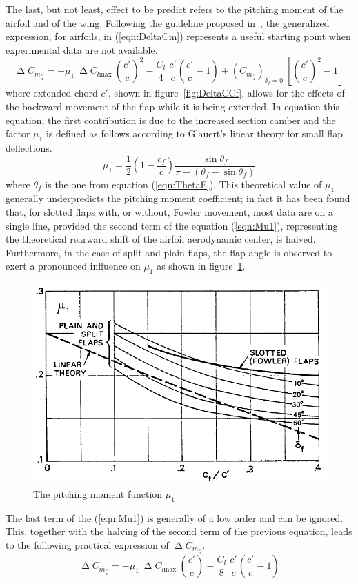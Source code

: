 \bigskip
\noindent
The last, but not least, effect to be predict refers to the pitching moment of the airfoil and of the wing. Following the guideline proposed in~\cite{torenbeek1982synthesis}, the generalized expression, for airfoils, in (\ref{eqn:DeltaCm}) represents a useful starting point when experimental data are not available.
%
\begin{equation}
\upDelta C_{m_{\frac{c}{4}}}=-\mu_1\ \upDelta C_{l\text{max}}\ \left(\dfrac{c'}{c}\right)^2-\dfrac{C_l}{4}\ \dfrac{c'}{c}\left(\dfrac{c'}{c}-1\right)+\left(C_{m_{\frac{c}{4}}}\right)_{\delta_f=0}\ \left[\left(\dfrac{c'}{c}\right)^2-1\right]
\label{eqn:DeltaCm}
\end{equation}
%
where extended chord $c'$, shown in figure~\ref{fig:DeltaCCf}, allows for the effects of the backward movement of the flap while it is being extended.
%
In equation this equation, the first contribution is due to the increased section camber and the factor $\mu_1$ is defined as follows according to Glauert's linear theory for small flap deflections.
%
\begin{equation}
\mu_1=\dfrac{1}{2}\left(1-\dfrac{c_f}{c}\right)\dfrac{\sin\theta_f}{\pi-\left(\theta_f-\sin\theta_f\right)}
\label{eqn:Mu1}
\end{equation}
%
where $\theta_f$ is the one from equation (\ref{eqn:ThetaF}). This theoretical value of $\mu_1$ generally underpredicts the pitching moment coefficient; in fact it has been found that, for slotted flaps with, or without, Fowler movement, most data are on a single line, provided the second term of the equation (\ref{eqn:Mu1}), representing the theoretical rearward shift of the airfoil aerodynamic center, is halved. Furthermore, in the case of split and plain flaps, the flap angle is observed to exert a pronounced influence on $\mu_1$ as shown in figure~\ref{fig:Mu1}.
%
\begin{figure}[!b]
\centering
\includegraphics[width=0.75\linewidth]{Mu1_Pitching_Moment}
\caption{The pitching moment function $\mu_1$}
\label{fig:Mu1}
\end{figure}
%
The last term of the (\ref{eqn:Mu1}) is generally of a low order and can be ignored. This, together with the halving of the second term of the previous equation, leads to the following practical expression of $\upDelta C_{m_{\frac{c}{4}}}$.
%
\begin{equation}
\upDelta C_{m_{\frac{c}{4}}}=-\mu_1\ \upDelta C_{l\text{max}}\ \left(\dfrac{c'}{c}\right)-\dfrac{C_l}{8}\ \dfrac{c'}{c}\left(\dfrac{c'}{c}-1\right)
\label{eqn:DeltaCmPractical}
\end{equation}


